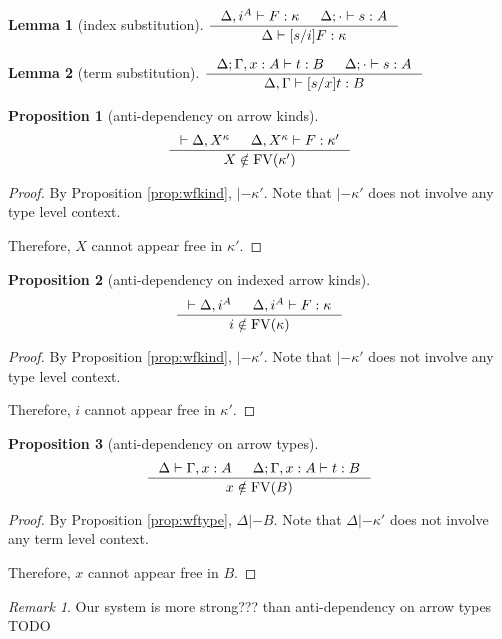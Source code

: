 \documentclass[preprint]{sigplanconf}
\newcommand{\FV}{\mathop{\mathrm{FV}}}
\theoremstyle{plain}
\newtheorem{proposition}{Proposition}
\newtheorem{lemma}{Lemma}
\theoremstyle{remark}
\newtheorem{remark}{Remark}
\theoremstyle{definition}
\begin{document}
\begin{lemma}[index substitution]\label{lem:ixsubst}
$ \inference{\Delta,i^A |- F:\kappa & \Delta;\cdot |- s:A}
	{\Delta |- [s/i]F:\kappa} $
\end{lemma}

\begin{lemma}[term substitution]\label{lem:tmsubst}
$ \inference{\Delta;\Gamma,x:A |- t:B & \Delta;\cdot |- s:A}
	{\Delta,\Gamma |- [s/x]t:B} $
\end{lemma}



\begin{proposition}[anti-dependency on arrow kinds]
\[ \inference{ |- \Delta,X^\kappa
             & \Delta,X^\kappa |- F : \kappa' }
             { X\notin\FV(\kappa') }
\]
\end{proposition}
\begin{proof}
	By Proposition \ref{prop:wfkind}, $|- \kappa'$.
	Note that $|- \kappa'$ does not involve any type level context.

	Therefore, $X$ cannot appear free in $\kappa'$.
\end{proof}

\begin{proposition}[anti-dependency on indexed arrow kinds]
\[ \inference{ |- \Delta,i^A
             & \Delta,i^A |- F : \kappa }
             { i\notin\FV(\kappa) }
\]
\end{proposition}
\begin{proof}
	By Proposition \ref{prop:wfkind}, $|- \kappa'$.
	Note that $|- \kappa'$ does not involve any type level context.

	Therefore, $i$ cannot appear free in $\kappa'$.
\end{proof}

\begin{proposition}[anti-dependency on arrow types]
\[ \inference{ \Delta |- \Gamma,x:A
             & \Delta;\Gamma,x:A |- t : B }
             { x\notin\FV(B) }
\]
\end{proposition}
\begin{proof}
	By Proposition \ref{prop:wftype}, $\Delta |- B$.
	Note that $\Delta |- \kappa'$ does not involve any term level context.

	Therefore, $x$ cannot appear free in $B$.
\end{proof}


\begin{remark} Our system is more strong??? than anti-dependency on arrow types
TODO
\end{remark}
\end{document}
